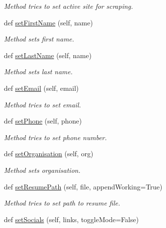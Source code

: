 \begin{DoxyCompactItemize}
\begin{DoxyCompactList}\small\item\em Method tries to set active site for scraping. \end{DoxyCompactList}\item 
def \hyperlink{classuserProfile_1_1userProfile_aafd4f084d296a83fb1ac2ff703aaa251}{set\+First\+Name} (self, name)
\begin{DoxyCompactList}\small\item\em Method sets first name. \end{DoxyCompactList}\item 
def \hyperlink{classuserProfile_1_1userProfile_ab6c77d7b146fbf8d9ffb79ae0d6a2c00}{set\+Last\+Name} (self, name)
\begin{DoxyCompactList}\small\item\em Method sets last name. \end{DoxyCompactList}\item 
def \hyperlink{classuserProfile_1_1userProfile_a6420f8a55919d59d5d357b9ed93cb279}{set\+Email} (self, email)
\begin{DoxyCompactList}\small\item\em Method tries to set email. \end{DoxyCompactList}\item 
def \hyperlink{classuserProfile_1_1userProfile_af57b152c37a8ce53368166751893e0b3}{set\+Phone} (self, phone)
\begin{DoxyCompactList}\small\item\em Method tries to set phone number. \end{DoxyCompactList}\item 
def \hyperlink{classuserProfile_1_1userProfile_a240b062efefc77fb5137306709aef5ed}{set\+Organisation} (self, org)
\begin{DoxyCompactList}\small\item\em Method sets organisation. \end{DoxyCompactList}\item 
def \hyperlink{classuserProfile_1_1userProfile_ae7ad036942595e2ae9c1247d2c49a63b}{set\+Resume\+Path} (self, file, append\+Working=True)
\begin{DoxyCompactList}\small\item\em Method tries to set path to resume file. \end{DoxyCompactList}\item 
def \hyperlink{classuserProfile_1_1userProfile_a4e47efdac8d7178519309a72b81cc8c0}{set\+Socials} (self, links, toggle\+Mode=False)

\end{DoxyCompactItemize}
